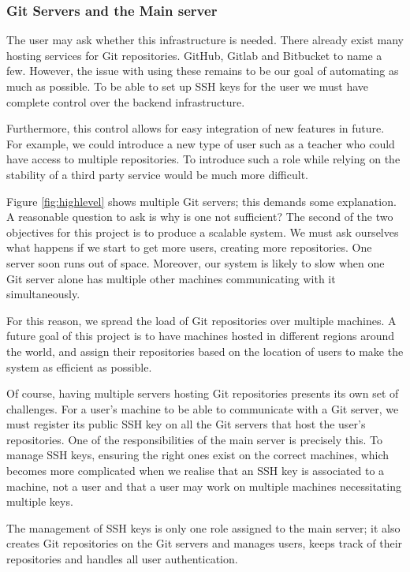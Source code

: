 \subsubsection{Git Servers and the Main server}

The user may ask whether this infrastructure is needed. There already exist many hosting services for Git repositories. GitHub, Gitlab and Bitbucket to name a few. However, the issue with using these remains to be our goal of automating as much as possible. To be able to set up SSH keys for the user we must have complete control over the backend infrastructure. 

Furthermore, this control allows for easy integration of new features in future. For example, we could introduce a new type of user such as a teacher who could have access to multiple repositories. To introduce such a role while relying on the stability of a third party service would be much more difficult.

Figure \ref{fig:highlevel} shows multiple Git servers; this demands some explanation. A reasonable question to ask is why is one not sufficient? The second of the two objectives for this project is to produce a scalable system. We must ask ourselves what happens if we start to get more users, creating more repositories. One server soon runs out of space. Moreover, our system is likely to slow when one Git server alone has multiple other machines communicating with it simultaneously.

For this reason, we spread the load of Git repositories over multiple machines. A future goal of this project is to have machines hosted in different regions around the world, and assign their repositories based on the location of users to make the system as efficient as possible.

Of course, having multiple servers hosting Git repositories presents its own set of challenges. For a user's machine to be able to communicate with a Git server, we must register its public SSH key on all the Git servers that host the user's repositories. One of the responsibilities of the main server is precisely this. To manage SSH keys, ensuring the right ones exist on the correct machines, which becomes more complicated when we realise that an SSH key is associated to a machine, not a user and that a user may work on multiple machines necessitating multiple keys.

The management of SSH keys is only one role assigned to the main server; it also creates Git repositories on the Git servers and manages users, keeps track of their repositories and handles all user authentication.

